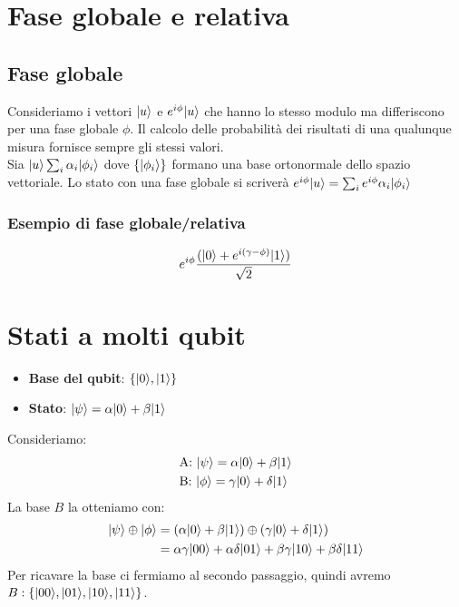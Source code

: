 \documentclass[12pt, a4paper]{report}
\begin{document}
\section{Fase globale e relativa}
\subsection{Fase globale}
Consideriamo i vettori $| u \rangle$ e $e^{i\phi}| u \rangle$ che hanno lo stesso modulo ma differiscono per una fase globale $\phi$. Il calcolo delle probabilità dei risultati di una qualunque misura fornisce sempre gli stessi valori.\\
Sia $| u \rangle\sum_{i}\alpha_{i}| \phi_{i} \rangle$ dove $\{| \phi_{i} \rangle\}$ formano una base ortonormale dello spazio vettoriale. Lo stato con una fase globale si scriverà $e^{i\phi}| u \rangle=\sum_{i}e^{i\phi}\alpha_{i}| \phi_{i} \rangle$
\subsubsection{Esempio di fase globale/relativa}
\begin{equation*}
    \tikzmark{ephi}e^{i\phi}\frac{(\ket{0}+\tikzmark{ephigamma}e^{i(\gamma - \phi)}\ket{1})}{\sqrt{2}}
\end{equation*}
\section{Stati a molti qubit}
\begin{itemize}
    \item \textbf{Base del qubit}: $\{| 0 \rangle,| 1 \rangle\}$
    \item \textbf{Stato}: $| \psi \rangle=\alpha| 0 \rangle+\beta| 1 \rangle$
\end{itemize}
Consideriamo:
\begin{equation}
    \begin{split}
        &\text{A: } | \psi \rangle = \alpha| 0 \rangle+\beta| 1 \rangle \\
        &\text{B: } | \phi \rangle = \gamma| 0 \rangle+\delta| 1 \rangle
    \end{split}
\end{equation}
La base $B$ la otteniamo con:
\begin{equation*}
    \begin{split}
        | \psi \rangle\oplus| \phi \rangle &= \left(\alpha| 0 \rangle+\beta| 1 \rangle\right)\oplus\left(\gamma| 0 \rangle+\delta| 1 \rangle\right)\\
        &= \alpha\gamma| 00 \rangle+\alpha\delta| 01 \rangle+\beta\gamma| 10 \rangle+\beta\delta| 11 \rangle
    \end{split}
\end{equation*}
Per ricavare la base ci fermiamo al secondo passaggio, quindi avremo $B:\left\{| 00 \rangle,| 01 \rangle,| 10 \rangle,| 11 \rangle\right\}$.
\end{document}
